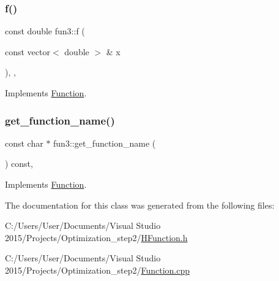 \subsubsection{\texorpdfstring{f()}{f()}}
{\footnotesize\ttfamily const double fun3\+::f (\begin{DoxyParamCaption}\item[{const vector$<$ double $>$ \&}]{x }\end{DoxyParamCaption})\hspace{0.3cm}{\ttfamily [inline]}, {\ttfamily [override]}, {\ttfamily [virtual]}}



Implements \hyperlink{class_function_ae700c7cb44bd2048d712466767be2803}{Function}.

\mbox{\label{classfun3_a51588a69a8a3a5c2a372b3c678e7d5a5}} 
\subsubsection{\texorpdfstring{get\+\_\+function\+\_\+name()}{get\_function\_name()}}
{\footnotesize\ttfamily const char $\ast$ fun3\+::get\+\_\+function\+\_\+name (\begin{DoxyParamCaption}{ }\end{DoxyParamCaption}) const\hspace{0.3cm}{\ttfamily [override]}, {\ttfamily [virtual]}}



Implements \hyperlink{class_function_a928c579622c47d98e91477ef18dec199}{Function}.



The documentation for this class was generated from the following files\+:\begin{DoxyCompactItemize}
\item 
C\+:/\+Users/\+User/\+Documents/\+Visual Studio 2015/\+Projects/\+Optimization\+\_\+step2/\hyperlink{_h_function_8h}{H\+Function.\+h}\item 
C\+:/\+Users/\+User/\+Documents/\+Visual Studio 2015/\+Projects/\+Optimization\+\_\+step2/\hyperlink{_function_8cpp}{Function.\+cpp}\end{DoxyCompactItemize}

